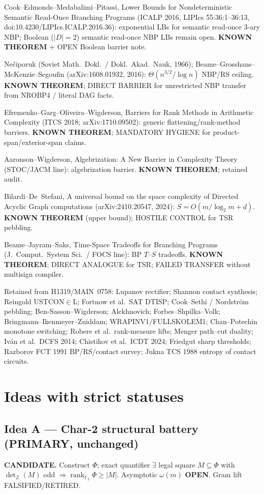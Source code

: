\documentclass[11pt]{article}
\begin{document}
Cook--Edmonds--Medabalimi--Pitassi, Lower Bounds for Nondeterministic Semantic
Read-Once Branching Programs (ICALP 2016, LIPIcs 55:36:1--36:13,
doi:10.4230/LIPIcs.ICALP.2016.36): exponential LBs for semantic read-once 3-ary NBP;
Boolean ($|D|=2$) semantic read-once NBP LBs remain open. \textbf{KNOWN THEOREM}
+ OPEN Boolean barrier note.

Ne\v{c}iporuk (Soviet Math.\ Dokl.\ / Dokl.\ Akad.\ Nauk, 1966);
Beame--Grosshans--McKenzie--Segoufin (arXiv:1608.01932, 2016):
$\Theta(n^{3/2}/\log n)$ NBP/RS ceiling. \textbf{KNOWN THEOREM}; DIRECT BARRIER for
unrestricted NBP transfer from NROBP4 / literal DAG facts.

Efremenko--Garg--Oliveira--Wigderson, Barriers for Rank Methods in Arithmetic Complexity
(ITCS 2018; arXiv:1710.09502): generic flattening/rank-method barriers.
\textbf{KNOWN THEOREM}; MANDATORY HYGIENE for product-span/exterior-span claims.

Aaronson--Wigderson, Algebrization: A New Barrier in Complexity Theory
(STOC/JACM line): algebrization barrier. \textbf{KNOWN THEOREM}; retained audit.

Bilardi--De~Stefani, A universal bound on the space complexity of Directed Acyclic Graph
computations (arXiv:2410.20547, 2024): $S=O(m/\log_2 m+d)$. \textbf{KNOWN THEOREM}
(upper bound); HOSTILE CONTROL for TSR pebbling.

Beame--Jayram--Saks, Time-Space Tradeoffs for Branching Programs
(J.\ Comput.\ System Sci.\ / FOCS line): BP $T$--$S$ tradeoffs.
\textbf{KNOWN THEOREM}; DIRECT ANALOGUE for TSR; FAILED TRANSFER without multisign compiler.

Retained from H1319/MAIN~0758: Lupanov rectifier; Shannon contact synthesis;
Reingold USTCON$\in$L; Fortnow et al.\ SAT DTISP; Cook--Sethi / Nordstr\"om pebbling;
Ben-Sasson--Wigderson; Alekhnovich; Forbes--Shpilka--Volk; Bringmann--Ikenmeyer--Zuiddam;
WRAPINV1/FULLSKOLEM1; Chan--Potechin monotone switching; Robere et al.\ rank-measure lifts;
Menger path--cut duality; Iv\'an et al.\ DCFS 2014; Chistikov et al.\ ICDT 2024;
Friedgut sharp thresholds; Razborov FCT 1991 BP/RS/contact survey;
Jukna TCS 1988 entropy of contact circuits.

\section*{Ideas with strict statuses}
\subsection*{Idea A --- Char-2 structural battery (PRIMARY, unchanged)}
\textbf{CANDIDATE.} Construct $\Phi$; exact quantifier
$\exists$ legal square $M\subseteq\Phi$ with $\det_{\mathbb Z}(M)$ odd
$\Rightarrow\operatorname{rank}_{\mathbb F_2}\Phi\ge|M|$. Asymptotic $\omega(m)$ \textbf{OPEN}.
Gram lift FALSIFIED/RETIRED.
\end{document}
